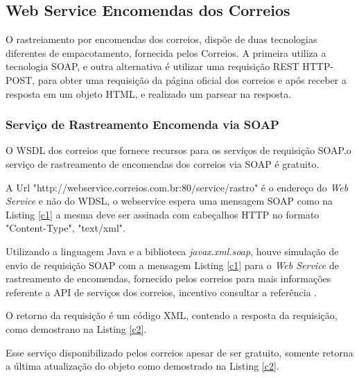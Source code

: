 \documentclass[12pt]{article}
\begin{document}
\subsection{Web Service Encomendas dos Correios}
	O rastreiamento por encomendas dos correios, dispõe de duas tecnologias diferentes de empacotamento, fornecida pelos Correios. A primeira utiliza a tecnologia SOAP, e outra alternativa é utilizar uma requisição REST HTTP-POST, para obter uma requisição da página oficial dos correios e após receber a resposta em um objeto HTML, e realizado um parsear na resposta.
\subsubsection{Serviço de Rastreamento Encomenda via SOAP}
O WSDL dos correios que fornece recursos para os serviços de requisição SOAP,o serviço de rastreamento de encomendas dos correios via SOAP é gratuito.

A Url "http://webservice.correios.com.br:80/service/rastro" é o endereço do \textit{Web Service} e não do WDSL, o webservice espera uma mensagem SOAP como na Listing \ref{c1} a mesma deve ser assinada com cabeçalhos HTTP no formato "Content-Type", "text/xml".


Utilizando a linguagem Java e a biblioteca \textit{javax.xml.soap}, houve simulação de envio de requisição SOAP com a mensagem Listing \ref{c1} para o \textit{Web Service} de rastreamento de encomendas, fornecido pelos correios para mais informações referente a API de serviços dos correios, incentivo consultar a referência \cite{correios}.

O retorno da requisição é um código XML, contendo a resposta da requisição, como demostrano na Listing \ref{c2}.
 
 Esse serviço disponibilizado pelos correios apesar de ser gratuito, somente retorna a última atualização do objeto como demostrado na Listing \ref{c2}.
\end{document}
